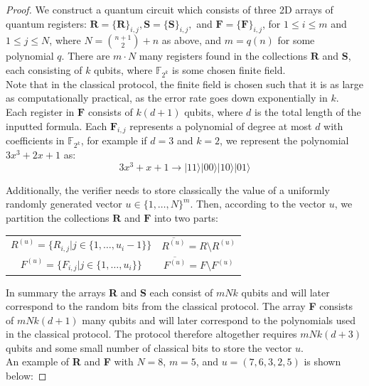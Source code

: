 \documentclass[12pt]{article}
\numberwithin{thm}{section}
\numberwithin{defn}{section}
\numberwithin{prop}{section}
\numberwithin{rmk}{section}
\newcommand{\ket}[1]{\vert #1 \rangle}
\begin{document}
	\begin{proof}
	We construct a quantum circuit which consists of three 2D arrays of quantum registers: $\textbf{R}=\{\textbf{R}\}_{i,j},\textbf{S}=\{\textbf{S}\}_{i,j},$ and $\textbf{F}=\{\textbf{F}\}_{i,j}$, for $1\leq i\leq m$ and $1\leq j\leq N$, where $N={{n+1}\choose{2}}+n$ as above, and $m=q(n)$ for some polynomial $q$. There are $m\cdot N$ many registers found in the collections $\textbf{R}$ and $\textbf{S}$, each consisting of $k$ qubits, where $\mathbb{F}_{2^k}$ is some chosen finite field. \\
	
	Note that in the classical protocol, the finite field is chosen such that it is as large as computationally practical, as the error rate goes down exponentially in $k$.\\
	
	 Each register in $\textbf{F}$ consists of $k(d+1)$ qubits, where $d$ is the total length of the inputted formula. Each $\textbf{F}_{i,j}$ represents a polynomial of degree at most $d$ with coefficients in $\mathbb{F}_{2^k}$, for example if $d=3$ and $k=2$, we represent the polynomial $3x^3+2x+1$ as:
	\[3x^3+x+1\to \ket{11}\ket{00}\ket{10}\ket{01}\]
	
	Additionally, the verifier needs to store classically the value of a uniformly randomly generated vector $u\in\{1,\dots,N\}^m$. Then, according to the vector $u$, we partition the collections $\textbf{R}$ and $\textbf{F}$ into two parts:
	\begin{center}
	\begin{tabular}{ c c }
	$R^{(u)}=\{R_{i,j}|j\in\{1,\dots,u_i-1\}\}$ & $\overline{R^{(u)}}=R \setminus R^{(u)}$\\
	$F^{(u)}=\{F_{i,j}|j\in\{1,\dots,u_i\}\}$ & $\overline{F^{(u)}}=F \setminus F^{(u)}$
	\end{tabular}
	\end{center}
	
	In summary the arrays \textbf{R} and \textbf{S} each consist of $mNk$ qubits and will later correspond to the random bits from the classical protocol. The array \textbf{F} consists of $mNk(d+1)$ many qubits and will later correspond to the polynomials used in the classical protocol. The protocol therefore altogether requires $mNk(d+3)$ qubits and some small number of classical bits to store the vector $u$. \\ 
	
	An example of \textbf{R} and \textbf{F} with $N=8$, $m=5$, and $u=(7,6,3,2,5)$ is shown below:
	

\end{proof}
\end{document}
